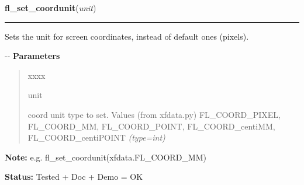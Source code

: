 \hspace{.8\funcindent}\begin{boxedminipage}{\funcwidth}

    \raggedright \textbf{fl\_set\_coordunit}(\textit{unit})

    \vspace{-1.5ex}

    \rule{\textwidth}{0.5\fboxrule}
\setlength{\parskip}{2ex}

Sets the unit for screen coordinates, instead of default ones (pixels).

-{}-
\setlength{\parskip}{1ex}
      \textbf{Parameters}
      \vspace{-1ex}

      \begin{quote}
        \begin{Ventry}{xxxx}

          \item[unit]


coord unit type to set. Values (from xfdata.py) FL\_COORD\_PIXEL,
FL\_COORD\_MM, FL\_COORD\_POINT, FL\_COORD\_centiMM, FL\_COORD\_centiPOINT
            {\it (type=int)}

        \end{Ventry}

      \end{quote}

\textbf{Note:} 
e.g. fl\_set\_coordunit(xfdata.FL\_COORD\_MM)


\textbf{Status:} 
Tested + Doc + Demo = OK


    \end{boxedminipage}

    \label{xformslib:flbasic:fl_set_border_width}

    \vspace{0.5ex}

